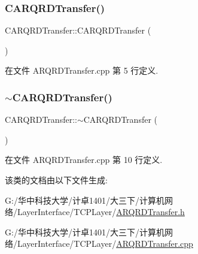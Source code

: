 \subsubsection{\texorpdfstring{C\+A\+R\+Q\+R\+D\+Transfer()}{CARQRDTransfer()}}
{\footnotesize\ttfamily C\+A\+R\+Q\+R\+D\+Transfer\+::\+C\+A\+R\+Q\+R\+D\+Transfer (\begin{DoxyParamCaption}{ }\end{DoxyParamCaption})}



在文件 A\+R\+Q\+R\+D\+Transfer.\+cpp 第 5 行定义.

\mbox{\label{class_c_a_r_q_r_d_transfer_a27024e3ea60f67f88838a053a458f3d6}} 
\subsubsection{\texorpdfstring{$\sim$\+C\+A\+R\+Q\+R\+D\+Transfer()}{~CARQRDTransfer()}}
{\footnotesize\ttfamily C\+A\+R\+Q\+R\+D\+Transfer\+::$\sim$\+C\+A\+R\+Q\+R\+D\+Transfer (\begin{DoxyParamCaption}{ }\end{DoxyParamCaption})}



在文件 A\+R\+Q\+R\+D\+Transfer.\+cpp 第 10 行定义.



该类的文档由以下文件生成\+:\begin{DoxyCompactItemize}
\item 
G\+:/华中科技大学/计卓1401/大三下/计算机网络/\+Layer\+Interface/\+T\+C\+P\+Layer/\hyperlink{_a_r_q_r_d_transfer_8h}{A\+R\+Q\+R\+D\+Transfer.\+h}\item 
G\+:/华中科技大学/计卓1401/大三下/计算机网络/\+Layer\+Interface/\+T\+C\+P\+Layer/\hyperlink{_a_r_q_r_d_transfer_8cpp}{A\+R\+Q\+R\+D\+Transfer.\+cpp}\end{DoxyCompactItemize}

